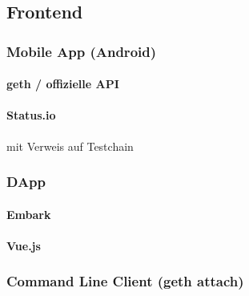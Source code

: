 \subsection{Frontend}
\subsubsection{Mobile App (Android)}
\paragraph{geth / offizielle API}
\paragraph{Status.io}
mit Verweis auf Testchain

\subsubsection{DApp}
\paragraph{Embark}
\paragraph{Vue.js}

\subsubsection{Command Line Client (geth attach)}


\section{}